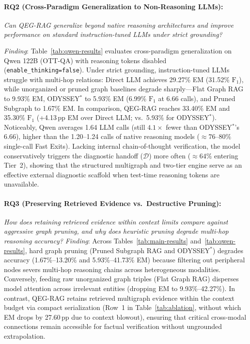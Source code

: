 \documentclass[runningheads]{llncs}
\begin{document}
\enlargethispage{2\baselineskip}
\paragraph{RQ2 (Cross-Paradigm Generalization to Non-Reasoning LLMs):}
\emph{Can QEG-RAG generalize beyond native reasoning architectures and improve performance on standard instruction-tuned LLMs under strict grounding?}

\emph{Finding}: Table~\ref{tab:qwen-results} evaluates cross-paradigm generalization on Qwen 122B (OTT-QA) with reasoning tokens disabled (\texttt{enable\_thinking=false}). Under strict grounding, instruction-tuned LLMs struggle with multi-hop relations: Direct LLM achieves 29.27\% EM (31.52\% $\text{F}_1$), while unorganized or pruned graph baselines degrade sharply---Flat Graph RAG to 9.93\% EM, ODYSSEY$^*$ to 5.93\% EM (6.99\% $\text{F}_1$ at 6.66 calls), and Pruned Subgraph to 1.67\% EM. In comparison, QEG-RAG reaches 33.40\% EM and 35.30\% $\text{F}_1$ (+4.13\,pp EM over Direct LLM; vs.\ 5.93\% for ODYSSEY$^*$). Noticeably, Qwen averages 1.64 LLM calls (still $4.1\times$ fewer than ODYSSEY$^*$'s 6.66), higher than the 1.20--1.24 calls of native reasoning models ($\approx 76\text{--}80\%$ single-call Fast Exits). Lacking internal chain-of-thought verification, the model conservatively triggers the diagnostic handoff ($\mathcal{D}$) more often ($\approx 64\%$ entering Tier~2), showing that the structured multigraph and two-tier engine serve as an effective external diagnostic scaffold when test-time reasoning tokens are unavailable.



\paragraph{RQ3 (Preserving Retrieved Evidence vs.\ Destructive Pruning):}
\emph{How does retaining retrieved evidence within context limits compare against aggressive graph pruning, and why does heuristic pruning degrade multi-hop reasoning accuracy?}
\emph{Finding}: Across Tables~\ref{tab:main-results} and~\ref{tab:qwen-results}, hard graph pruning (Pruned Subgraph RAG and ODYSSEY$^*$) degrades accuracy (1.67\%--13.20\% and 5.93\%--41.73\% EM) because filtering out peripheral nodes severs multi-hop reasoning chains across heterogeneous modalities. Conversely, feeding raw unorganized graph triples (Flat Graph RAG) disperses model attention across irrelevant entities (dropping EM to 9.93\%--42.27\%). In contrast, QEG-RAG retains retrieved multigraph evidence within the context budget via compact serialization (Row~1 in Table~\ref{tab:ablation}, without which EM drops by 27.60\,pp due to context blowout), ensuring that critical cross-modal connections remain accessible for factual verification without ungrounded extrapolation.
\end{document}
